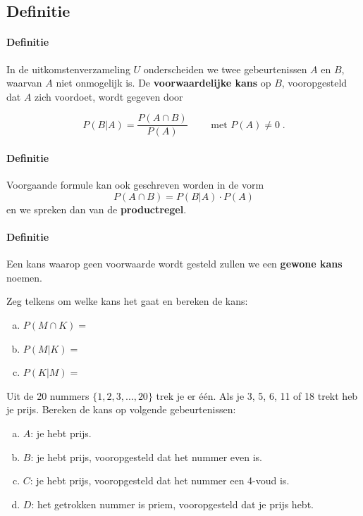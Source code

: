 \documentclass[12pt,twoside]{article}
\begin{document}
\subsection{Definitie}

\paragraph*{Definitie}
In de uitkomstenverzameling $U$ onderscheiden we twee gebeurtenissen $A$ en $B$, waarvan $A$ niet onmogelijk is. De {\bf voorwaardelijke kans} op $B$, vooropgesteld dat $A$ zich voordoet, wordt gegeven door\\
\begin{mdframed}
$$P(B|A)=\dfrac{P(A\cap B)}{P(A)}\qquad\mbox{ met }P(A)\neq 0\;.$$
\end{mdframed}

\paragraph*{Definitie}
Voorgaande formule kan ook geschreven worden in de vorm
$$P(A\cap B)=P(B|A)\cdot P(A)$$
en we spreken dan van de {\bf productregel}.

\paragraph*{Definitie} Een kans waarop geen voorwaarde wordt gesteld zullen we een {\bf gewone kans} noemen.

\begin{oefening}
Zeg telkens om welke kans het gaat en bereken de kans:
\begin{enumerate}[(a)]
  \item $P(M\cap K)=$\arulefill
  \item $P(M|K)=$\arulefill
  \item $P(K|M)=$\arulefill
\end{enumerate}
\end{oefening}

\begin{oefening}
Uit de 20 nummers $\{1,2,3,\ldots,20\}$ trek je er één. Als je 3, 5, 6, 11 of 18 trekt heb je
prijs. Bereken de kans op volgende gebeurtenissen:
\begin{enumerate}[(a)]
  \item $A$: je hebt prijs.
  \item $B$: je hebt prijs, vooropgesteld dat het nummer even is.
  \item $C$: je hebt prijs, vooropgesteld dat het nummer een 4-voud is.
  \item $D$: het getrokken nummer is priem, vooropgesteld dat je prijs hebt.
\end{enumerate}
\end{oefening}
\end{document}
